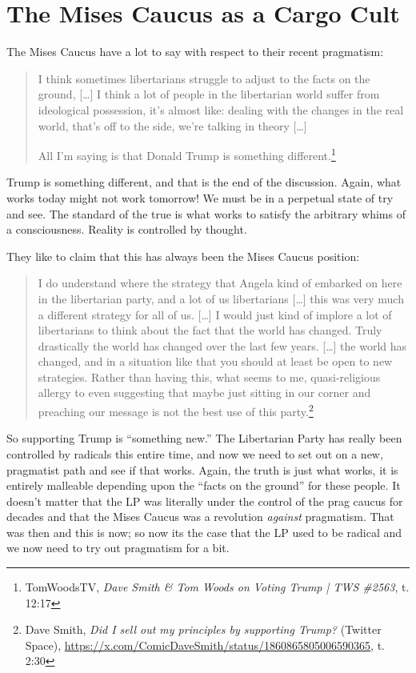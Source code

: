 \documentclass[11pt]{article}
\begin{document}
\section{The Mises Caucus as a Cargo Cult}
\label{sec:org0e33688}
The Mises Caucus have a lot to say with respect to their recent pragmatism:
\begin{quote}
I think sometimes libertarians struggle to adjust to the facts on the ground, [\ldots{}] I think a lot of people in the libertarian world suffer from ideological possession, it's almost like: dealing with the changes in the real world, that's off to the side, we're talking in theory [\ldots{}]

All I'm saying is that Donald Trump is something different.\footnote{TomWoodsTV, \emph{Dave Smith \& Tom Woods on Voting Trump | TWS \#2563}, t. 12:17}
\end{quote}

Trump is something different, and that is the end of the discussion. Again, what works today might not work tomorrow! We must be in a perpetual state of try and see. The standard of the true is what works to satisfy the arbitrary whims of a consciousness. Reality is controlled by thought.

They like to claim that this has always been the Mises Caucus position:
\begin{quote}
I do understand where the strategy that Angela kind of embarked on here in the libertarian party, and a lot of us libertarians [\ldots{}] this was very much a different strategy for all of us. [\ldots{}] I would just kind of implore a lot of libertarians to think about the fact that the world has changed. Truly drastically the world has changed over the last few years. [\ldots{}] the world has changed, and in a situation like that you should at least be open to new strategies. Rather than having this, what seems to me, quasi-religious allergy to even suggesting that maybe just sitting in our corner and preaching our message is not the best use of this party.\footnote{Dave Smith, \emph{Did I sell out my principles by supporting Trump?} (Twitter Space), \url{https://x.com/ComicDaveSmith/status/1860865805006590365}, t. 2:30}
\end{quote}

So supporting Trump is ``something new.'' The Libertarian Party has really been controlled by radicals this entire time, and now we need to set out on a new, pragmatist path and see if that works. Again, the truth is just what works, it is entirely malleable depending upon the ``facts on the ground'' for these people. It doesn't matter that the LP was literally under the control of the prag caucus for decades and that the Mises Caucus was a revolution \emph{against} pragmatism. That was then and this is now; so now its the case that the LP used to be radical and we now need to try out pragmatism for a bit.
\end{document}
